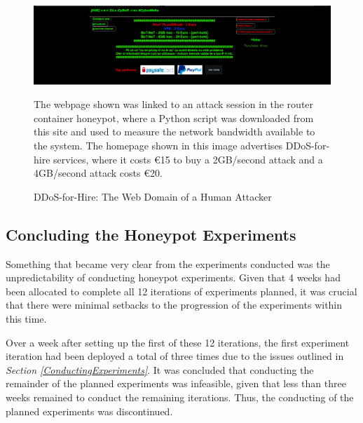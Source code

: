 \begin{figure}[ht]
      \centering
      \includegraphics[width=160mm, scale=1]{Images/cybermafia_ddos-for-hire.PNG}
      \caption{DDoS-for-Hire: The Web Domain of a Human Attacker} 
      \medskip
      \small
		The webpage shown was linked to an attack session in the router container honeypot, where a Python script was downloaded from this site and used to measure the network bandwidth available to the system. The homepage shown in this image advertises DDoS-for-hire services, where it costs  \euro{15} to buy a 2GB/second attack and a 4GB/second attack costs \euro{20}.
\label{fig:CyberMafiaDDoSForHire}
\end{figure}
 


\subsection{Concluding the Honeypot Experiments}
Something that became very clear from the experiments conducted was the unpredictability of conducting honeypot experiments. Given that 4 weeks had been allocated to complete all 12 iterations of experiments planned, it was crucial that there were minimal setbacks to the progression of the experiments within this time.

Over a week after setting up the first of these 12 iterations, the first experiment iteration had been deployed a total of three times due to the issues outlined in \textit{Section \ref{ConductingExperiments}}. It was concluded that conducting the remainder of the planned experiments was infeasible, given that less than three weeks remained to conduct the remaining iterations. Thus, the conducting of the planned experiments was discontinued.



